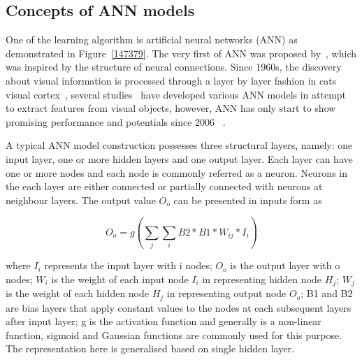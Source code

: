 \subsection{Concepts of ANN models}
One of the learning algorithm is artificial neural networks (ANN) as demonstrated in Figure~\ref{147379}. The very first of ANN was proposed by~\citet{McCulloch_1943}, which was inspired by the structure of neural connections. Since 1960s, the discovery about visual information is processed through a layer by layer fashion in cats visual cortex~\cite{Hubel_1959,Hubel_1962}, several studies~\cite{Weng,Weng_1992,Weng_1997,Wenga,Riesenhuber_1999,Viglione_1970} have developed various ANN models in attempt to extract features from visual objects, however, ANN has only start to show promising performance and potentials since 2006 ~\cite{Hinton_2006a, Hinton_2006_1}. 
\par 
A typical ANN model construction possesses three structural layers, namely: one input layer, one or more hidden layers and one output layer. Each layer can have one or more nodes and each node is commonly referred as a neuron. Neurons in the each layer are either connected or partially connected with neurons at neighbour layers. The output value $O_o$ can be presented in inputs form as 

\begin{equation}
   O_o = g( \sum_{j} \sum_{i} B2*B1*W_{ij} * I_i) 
\end{equation}

where $I_i$ represents the input layer with i nodes; $O_o$ is the output layer with o nodes; $W_{i}$ is the weight of each input node $I_i$ in representing hidden node $H_j$; $W_{j}$ is the weight of each hidden node $H_j$ in representing output node $O_o$;  B1 and B2 are bias layers that apply constant values to the nodes at each subsequent layers after input layer; g is the activation function and generally is a non-linear function, sigmoid and Gaussian functions are commonly used for this purpose. The representation here is generalised based on single hidden layer.

